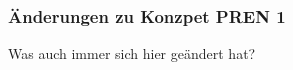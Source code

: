\documentclass[main.tex]{subfiles} %
\begin{document}

\subsubsection{Änderungen zu Konzpet PREN 1}

Was auch immer sich hier geändert hat?
\end{document}
